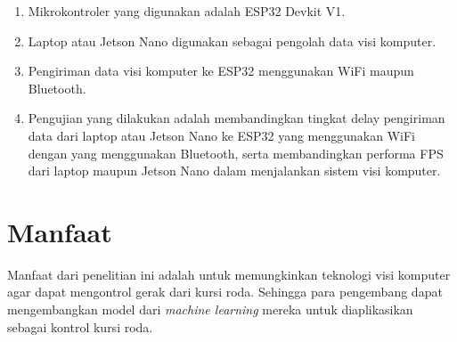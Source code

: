 \begin{enumerate}[nolistsep]

  \item Mikrokontroler yang digunakan adalah ESP32 Devkit V1.

  \item Laptop atau Jetson Nano digunakan sebagai pengolah data visi komputer.

  \item Pengiriman data visi komputer ke ESP32 menggunakan WiFi maupun Bluetooth.

  \item Pengujian yang dilakukan adalah membandingkan tingkat delay pengiriman data dari laptop atau Jetson Nano ke ESP32 yang menggunakan WiFi dengan yang menggunakan Bluetooth, serta membandingkan performa FPS dari laptop maupun Jetson Nano dalam menjalankan sistem visi komputer.

\end{enumerate}

\section{Manfaat}
Manfaat dari penelitian ini adalah untuk memungkinkan teknologi visi komputer agar dapat mengontrol gerak dari kursi roda. Sehingga para pengembang dapat mengembangkan model dari \emph{machine learning} mereka untuk diaplikasikan sebagai kontrol kursi roda.